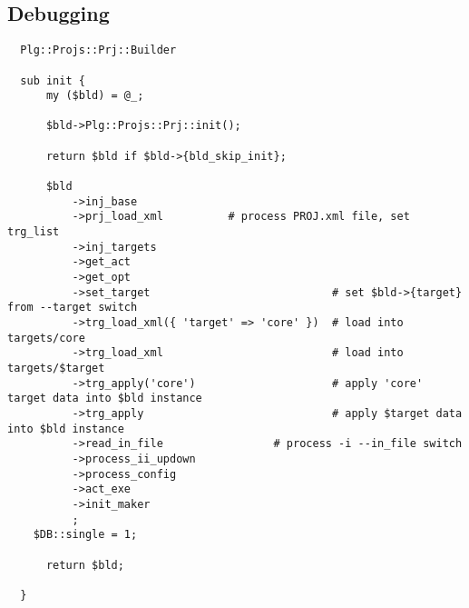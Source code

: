





\subsection{Debugging}
\label{sec:build.dbg}

\begin{Verbatim}
  Plg::Projs::Prj::Builder

  sub init {
      my ($bld) = @_;

      $bld->Plg::Projs::Prj::init();

      return $bld if $bld->{bld_skip_init};

      $bld
          ->inj_base
          ->prj_load_xml          # process PROJ.xml file, set trg_list
          ->inj_targets
          ->get_act
          ->get_opt
          ->set_target                            # set $bld->{target} from --target switch
          ->trg_load_xml({ 'target' => 'core' })  # load into targets/core
          ->trg_load_xml                          # load into targets/$target
          ->trg_apply('core')                     # apply 'core' target data into $bld instance
          ->trg_apply                             # apply $target data into $bld instance
          ->read_in_file                 # process -i --in_file switch
          ->process_ii_updown
          ->process_config
          ->act_exe
          ->init_maker
          ;
    $DB::single = 1;

      return $bld;

  }
\end{Verbatim}
